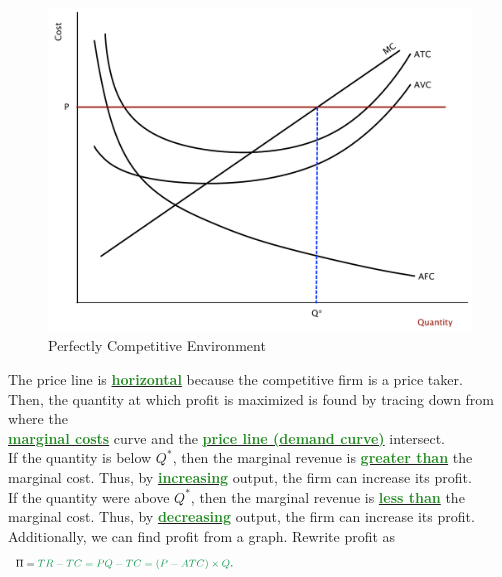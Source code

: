 \documentclass[11pt]{article}\usepackage[]{graphicx}\usepackage[]{color}
\theoremstyle{definition}
\newcommand{\ddp}[1]{{\textbf{\textcolor{ForestGreen}{#1}}}}
\newcommand{\dd}[1]{{\underline{\textbf{\textcolor{ForestGreen}{#1}}}}}
\begin{document}
		\begin{figure}[H]
			\centering
			\includegraphics[scale=.40]{plot61.pdf}
			\caption{Perfectly Competitive Environment}
		\end{figure}
	
	The price line is \dd{horizontal} because the competitive firm is a price taker. 
	\\
	
	Then, the quantity at which profit is maximized is found by tracing down from where the \\ \dd{marginal costs} curve and the \dd{price line (demand curve)} intersect.
	\\
	
	If the quantity is below $Q^*$, then the marginal revenue is \dd{greater than} the marginal cost. Thus, by \dd{increasing} output, the firm can increase its profit. 
	\\
	
	If the quantity were above $Q^*$, then the marginal revenue is \dd{less than} the marginal cost. Thus, by \dd{decreasing} output, the firm can increase its profit. 
	\\
	
	Additionally, we can find profit from a graph. Rewrite profit as 
	\begin{equation*}
	\Pi = \ddp{$TR - TC = PQ - TC = (P-ATC)\times Q$.}
	\phantom{\hspace{9cm}}
	\end{equation*}
	
\end{document}

